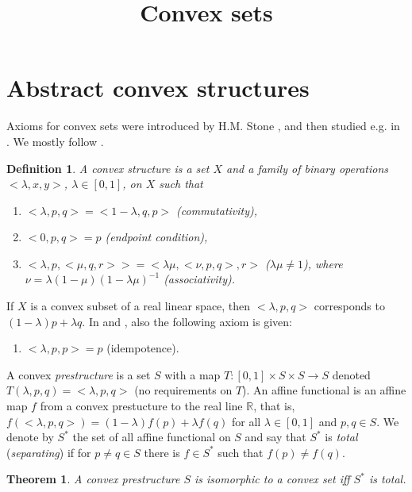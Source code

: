 \documentclass[12pt,letterpaper]{article}
\newtheorem{theorem}[lemma]{Theorem}
\newtheorem{definition}[lemma]{Definition}
\begin{document}
\title{Convex sets }
\maketitle


\section{Abstract convex structures }

Axioms for convex sets were introduced by H.M. Stone \cite{S}, and  then studied e.g. in \cite{G,CF}. We mostly follow \cite{G}.

\begin{definition}\label{de:conv} A convex structure is a set $X$ and a family of binary operations $<\lambda,x,y>$, $\lambda\in [0,1]$, on $X$ such that
\begin{enumerate}
\item[(c1)] $<\lambda, p,q> =<1-\lambda,q,p>$ (commutativity),
\item[(c2)] $<0,p,q>=p$ (endpoint condition),
\item[(c3)]  $<\lambda,p,<\mu,q,r>>=<\lambda\mu,<\nu,p,q>,r>$ ($\lambda\mu\neq 1$), where $\nu=\lambda(1-\mu)(1-\lambda\mu)^{-1}$ (associativity).
\end{enumerate}
\end{definition}

If $X$ is a convex subset of a real linear space, then $<\lambda,p,q>$ corresponds to $(1-\lambda)p+\lambda q$.
In \cite{S} and \cite{CF}, also the following axiom is given:

\begin{enumerate}
\item[(c4)] $<\lambda,p,p>=p$ (idempotence).
\end{enumerate}

A convex \emph{prestructure} is a set $S$ with a map $T:[0,1]\times S\times S \to S$ denoted $T(\lambda,p,q)=<\lambda,p,q>$ (no requirements on $T$).
An \rm{affine functional} is an affine map $f$ from a convex prestucture to the real line $\mathbb R$, that is, $f(<\lambda,p,q>)=(1-\lambda)f(p)+\lambda f(q)$ for all $\lambda \in [0,1]$ and $p,q\in S$. We denote by $S^*$ the set of all affine functional on $S$ and say that $S^*$ is \emph{total} (\emph{separating}) if for $p\neq q\in S$ there is $f\in S^*$ such that $f(p)\neq f(q)$.

\begin{theorem} A convex prestructure $S$ is isomorphic to a convex set iff $S^*$ is total.
\end{theorem}
\end{document}
